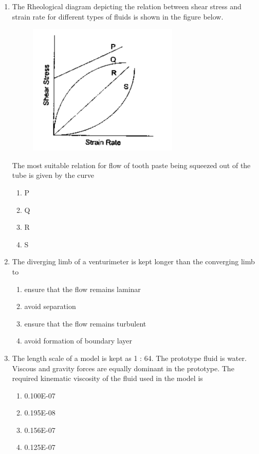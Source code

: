 \documentclass[a4paper,10pt]{article}
\begin{document}
\begin{enumerate}
\item The Rheological diagram depicting the relation between shear stress and strain rate for different types of fluids is shown in the figure below.
\begin{figure}[H]
    \centering
    \includegraphics[width=0.4\columnwidth]{Bq5.png}
    \caption*{}
    \label{fig:q5}
\end{figure}
The most suitable relation for flow of tooth paste being squeezed out of the tube is given by the curve
\hfill{}

\begin{multicols}{4}
\begin{enumerate}
\item P
\item Q
\item R
\item S
\end{enumerate}
\end{multicols}

\item The diverging limb of a venturimeter is kept longer than the converging limb to
\hfill{}

\begin{enumerate}
\item ensure that the flow remains laminar
\item avoid separation
\item ensure that the flow remains turbulent
\item avoid formation of boundary layer
\end{enumerate}

\item The length scale of a model is kept as 1 : 64. The prototype fluid is water. Viscous and gravity forces are equally dominant in the prototype. The required kinematic viscosity  of the fluid used in the model is
\hfill{}

\begin{multicols}{2}
\begin{enumerate}
\item 0.100E-07
\item 0.195E-08
\item 0.156E-07
\item 0.125E-07
\end{enumerate}
\end{multicols}


\end{enumerate}
\end{document}
